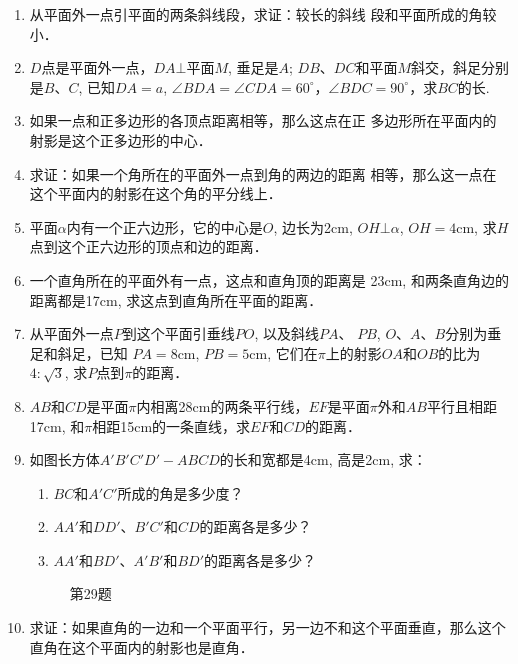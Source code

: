 \begin{enumerate}
\item 从平面外一点引平面的两条斜线段，求证：较长的斜线
段和平面所成的角较小．
\item $D$点是平面外一点，$DA\bot $平面$M$, 垂足是$A$; $DB$、$DC$和平面$M$斜交，斜足分别是$B$、$C$, 已知$DA=a$, $\angle BDA=\angle CDA=60^{\circ}$，$\angle BDC=90^{\circ}$，求$BC$的长.
\item 如果一点和正多边形的各顶点距离相等，那么这点在正
多边形所在平面内的射影是这个正多边形的中心．
\item 求证：如果一个角所在的平面外一点到角的两边的距离
相等，那么这一点在这个平面内的射影在这个角的平分线上．
\item 平面$\alpha$内有一个正六边形，它的中心是$O$, 边长为2cm,
 $OH\bot \alpha$, $OH=4$cm, 求$H$点到这个正六边形的顶点和边的距离．
\item 一个直角所在的平面外有一点，这点和直角顶的距离是
23cm, 和两条直角边的距离都是17cm, 求这点到直角所在平面的距离．
\item 从平面外一点$P$到这个平面引垂线$PO$, 以及斜线$PA$、
$PB$, $O$、$A$、$B$分别为垂足和斜足，已知 $PA=8$cm, $PB=5$cm, 它们在$\pi$上的射影$OA$和$OB$的比为$4:\sqrt{3}$, 求$P$点到$\pi$的距离．
\item $AB$和$CD$是平面$\pi$内相离28cm的两条平行线，$EF$是平面$\pi$外和$AB$平行且相距17cm, 和$\pi$相距15cm的一条直线，求$EF$和$CD$的距离．

\item 如图长方体$A'B'C'D'-ABCD$的长和宽都是4cm, 高是2cm, 求：
\begin{enumerate}
 \item $BC$和$A'C'$所成的角是多少度？
\item $AA'$和$DD'$、$B'C'$和$CD$的距离各是多少？
\item $AA'$和$BD'$、$A'B'$和$BD'$的距离各是多少？
\end{enumerate}

\begin{figure}[htp]
  \centering
{}
  \caption*{第29题}
\end{figure}


\item 求证：如果直角的一边和一个平面平行，另一边不和这个平面垂直，那么这个直角在这个平面内的射影也是直角．
\end{enumerate}

